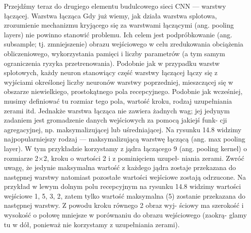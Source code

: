 \documentclass[12pt]{mwbk}
\theoremstyle{plain}
\theoremstyle{definition}
\theoremstyle{remark}
\begin{document}
Przejdźmy teraz do drugiego elementu budulcowego sieci CNN — warstwy łączącej.
Warstwa łącząca
Gdy już wiemy, jak działa warstwa splotowa, zrozumienie mechanizmu kryjącego się za warstwami
łączącymi (ang. pooling layers) nie powinno stanowić problemu. Ich celem jest podpróbkowanie
(ang. subsample; tj. zmniejszenie) obrazu wejściowego w celu zredukowania obciążenia obliczeniowego,
wykorzystania pamięci i liczby parametrów (a tym samym ograniczenia ryzyka przetrenowania).
Podobnie jak w przypadku warstw splotowych, każdy neuron stanowiący część warstwy łączącej
łączy się z wyjściami określonej liczby neuronów warstwy poprzedniej, mieszczącej się w obszarze
niewielkiego, prostokątnego pola recepcyjnego. Podobnie jak wcześniej, musimy definiować tu
rozmiar tego pola, wartość kroku, rodzaj uzupełniania zerami itd. Jednakże warstwa łącząca nie zawiera
żadnych wag; jej jedynym zadaniem jest gromadzenie danych wejściowych za pomocą jakiejś funk-
cji agregacyjnej, np. maksymalizującej lub uśredniającej. Na rysunku 14.8 widzimy najpopularniejszy
rodzaj — maksymalizującą warstwę łączącą (ang. max pooling layer). W tym przykładzie korzystamy
z jądra łączącego 9 (ang. pooling kernel) o rozmiarze 2×2, kroku o wartości 2 i z pominięciem uzupeł-
niania zerami. Zwróć uwagę, że jedynie maksymalna wartość z każdego jądra zostaje przekazana do
następnej warstwy natomiast pozostałe wartości wejściowe zostają odrzucone. Na przykład w lewym
dolnym polu recepcyjnym na rysunku 14.8 widzimy wartości wejściowe 1, 5, 3, 2, zatem tylko wartość
maksymalna (5) zostanie przekazana do następnej warstwy. Z powodu kroku równego 2 obraz wyj-
ściowy ma szerokość i wysokość o połowę mniejsze w porównaniu do obrazu wejściowego (zaokrą-
glamy tu w dół, ponieważ nie korzystamy z uzupełniania zerami).
\end{document}
